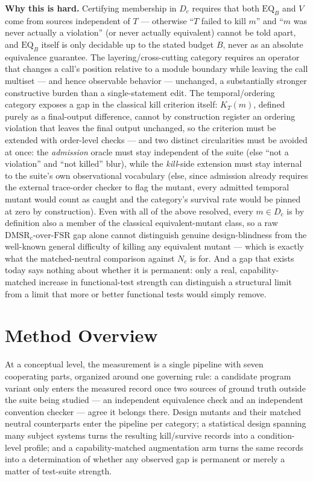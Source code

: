 \documentclass[11pt]{article}
\begin{document}
\noindent\textbf{Why this is hard.} Certifying membership in $D_c$ requires that both $\mathrm{EQ}_B$ and $V$ come from sources independent of $T$ --- otherwise ``$T$ failed to kill $m$'' and ``$m$ was never actually a violation'' (or never actually equivalent) cannot be told apart, and $\mathrm{EQ}_B$ itself is only decidable up to the stated budget $B$, never as an absolute equivalence guarantee. The layering/cross-cutting category requires an operator that changes a call's position relative to a module boundary while leaving the call multiset --- and hence observable behavior --- unchanged, a substantially stronger constructive burden than a single-statement edit. The temporal/ordering category exposes a gap in the classical kill criterion itself: $K_T(m)$, defined purely as a final-output difference, cannot by construction register an ordering violation that leaves the final output unchanged, so the criterion must be extended with order-level checks --- and two distinct circularities must be avoided at once: the \emph{admission} oracle must stay independent of the suite (else ``not a violation'' and ``not killed'' blur), while the \emph{kill}-side extension must stay internal to the suite's own observational vocabulary (else, since admission already requires the external trace-order checker to flag the mutant, every admitted temporal mutant would count as caught and the category's survival rate would be pinned at zero by construction). Even with all of the above resolved, every $m \in D_c$ is by definition also a member of the classical equivalent-mutant class, so a raw $\mathrm{DMSR}_c$-over-$\mathrm{FSR}$ gap alone cannot distinguish genuine design-blindness from the well-known general difficulty of killing any equivalent mutant --- which is exactly what the matched-neutral comparison against $N_c$ is for. And a gap that exists today says nothing about whether it is permanent: only a real, capability-matched increase in functional-test strength can distinguish a structural limit from a limit that more or better functional tests would simply remove.

\section{Method Overview}

At a conceptual level, the measurement is a single pipeline with seven cooperating parts, organized around one governing rule: a candidate program variant only enters the measured record once two sources of ground truth outside the suite being studied --- an independent equivalence check and an independent convention checker --- agree it belongs there. Design mutants and their matched neutral counterparts enter the pipeline per category; a statistical design spanning many subject systems turns the resulting kill/survive records into a condition-level profile; and a capability-matched augmentation arm turns the same records into a determination of whether any observed gap is permanent or merely a matter of test-suite strength.
\end{document}
